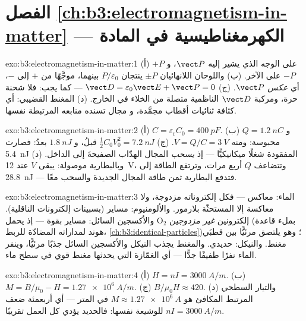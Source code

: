 \section*{الفصل \ref{ch:b3:electromagnetism-in-matter} --- الكهرمغناطيسية في المادة}

\begin{solution}{exo:b3:electromagnetism-in-matter:1}
(أ) $+P$ على الوجه الذي يشير إليه $\vect P$، و $-P$ على الآخر. (ب)
واللوحان اللانهائيان $\pm P$ ينتجان $P/\varepsilon_0$ بينهما،
موجَّهًا من $+$ إلى $-$، أي \emph{عكس} $\vect P$. (ج)
$\vect D = \varepsilon_0\vect E + \vect P = 0$ --- كما يجب:
فلا شحنة حرة، ومركبة $\vect D$ الناظمية متصلة من
الخلاء في الخارج. (د) المغنط القضيبي: أي كثافة ثنائيات أقطاب مجمَّدة، و
مجال تسنده منابعه المرتبطة نفسها.
\end{solution}

\begin{solution}{exo:b3:electromagnetism-in-matter:2}
(أ) $C = \varepsilon_{\text{r}}C_0 = \qty{400}{pF}$. (ب) و $Q =
\qty{1.2}{nC}$ محبوسة: ومنه $V = Q/C = \qty{3}{V}$. (ج)
$\tfrac12C_0V_0^2 = \qty{7.2}{nJ}$ قبلُ، و $\qty{1.8}{nJ}$ بعدُ:
فصارت \qty{5.4}{nJ} المفقودة شغلًا ميكانيكيًّا --- إذ \emph{يسحب}
المجال الهدّاب الصفيحةَ إلى الداخل. (د) وبالبطارية موصولة: يبقى $V$
عند \qty{12}{V}، وتتضاعف $Q$ أربع مرات، وترتفع الطاقة إلى \qty{28.8}{nJ} ---
فتدفع البطارية ثمن طاقة المجال الجديدة والسحب معًا.
\end{solution}

\begin{solution}{exo:b3:electromagnetism-in-matter:3}
الماء: معاكس --- فكل إلكتروناته مزدوجة، ولا معاكسة إلا
المستحثّة بلارمور. والألومنيوم: مساير (بسبينات إلكترونات الناقلية).
والأكسجين السائل: مساير بقوة --- إذ يحمل O$_2$ إلكترونين
\emph{غير مزدوجين} (بملء قاعدة هوند لمداراته
المضادّة للربط، \cref{ch:b3:identical-particles})؛ وهو يلتصق مرئيًّا
بين قطبَي مغنط. والنيكل: حديدي. والمغنط يجذب
النيكل والأكسجين السائل جذبًا مرئيًّا، وينفر الماء
نفرًا طفيفًا جدًّا --- أي الغمّازة التي يحدثها مغنط قوي في سطح ماء.
\end{solution}

\begin{solution}{exo:b3:electromagnetism-in-matter:4}
(أ) $H = nI = \qty{3000}{A/m}$. (ب) $M = B/\mu_0 - H =
\qty{1.27e6}{A/m}$. (ج) $B/\mu_0H \approx 420$. (د) والتيار
السطحي المرتبط المكافئ هو $M \approx \qty{1.27e6}{A}$ في
المتر --- أي أربعمئة ضعف $nI = \qty{3000}{A/m}$ للوشيعة نفسها:
فالحديد يؤدي كل العمل تقريبًا.
\end{solution}

